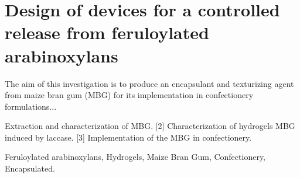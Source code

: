 \chapter*{Design of devices for a controlled release from feruloylated arabinoxylans}

\begin{SummaryPhDThesis}

The aim of this investigation is to produce an encapsulant and texturizing agent from maize bran gum (MBG) for its implementation in confectionery formulations...

	\begin{HighlightsPhDThesis}
		[1] Extraction and characterization of MBG. 
		[2] Characterization of hydrogels MBG induced by laccase. 
		[3] Implementation of the MBG in confectionery.
	\end{HighlightsPhDThesis}

	\begin{keywordsPhDThesis}
		Feruloylated arabinoxylans, Hydrogels, Maize Bran Gum, Confectionery, Encapsulated.
	\end{keywordsPhDThesis}

\end{SummaryPhDThesis}

